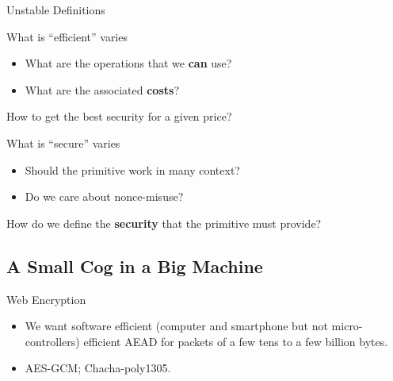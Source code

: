 \documentclass[presentation,aspectratio=1610]{beamer}
\begin{document}
\begin{frame}{Unstable Definitions}
  \begin{alertblock}{What is ``efficient'' varies}
    \begin{itemize}
    \item What are the operations that we \textbf{can} use?
    \item What are the associated \textbf{costs}? 
    \end{itemize}
    \begin{center}
      How to get the best security for a given price?
    \end{center}
  \end{alertblock}

  
  
  \begin{exampleblock}{What is ``secure'' varies}
    \begin{itemize}
    \item Should the primitive work in many context? \hfill{}
    \item Do we care about nonce-misuse? \hfill{}
    \end{itemize}
    \begin{center}
      How do we define the \textbf{security} that the primitive must provide?
    \end{center}
  \end{exampleblock}
\end{frame}


\subsection{A Small Cog in a Big Machine}


\begin{frame}{Web Encryption}
  \begin{center}

    \begin{itemize}
    \item<6-> We want \alert{software efficient} (computer and smartphone but not micro-controllers) efficient \alert{AEAD} for packets of a few tens to a few billion bytes.
    \item<7> AES-GCM; Chacha-poly1305.
    \end{itemize}
  \end{center}
\end{frame}
\end{document}
